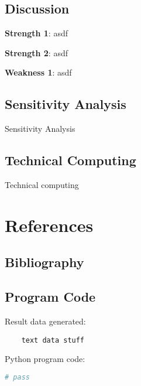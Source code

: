 \documentclass{mcm}
\numberwithin{figure}{section}
\numberwithin{table}{section}
\numberwithin{equation}{section}
\begin{document}
    \subsection{Discussion}

    \noindent\textbf{Strength 1}: asdf

    \noindent\textbf{Strength 2}: asdf

    \noindent\textbf{Weakness 1}: asdf

    \subsection{Sensitivity Analysis}
    Sensitivity Analysis

    \subsection{Technical Computing}
    Technical computing


    \newpage


    \section{References}

    \subsection{Bibliography}
    \printbibliography

    \subsection{Program Code}
    \noindent Result data generated:
    \begin{verbatim}
    text data stuff

    \end{verbatim}

    \noindent Python program code:
    \begin{lstlisting}[language=Python,label={lst:code}]
        # pass

    \end{lstlisting}
\end{document}
